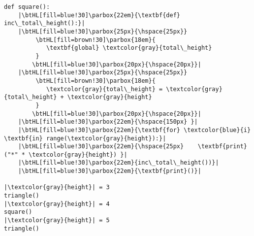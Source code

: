 \begin{lstlisting}[mathescape,escapechar=|]
def square():
    |\btHL[fill=blue!30]\parbox{22em}{\textbf{def} inc\_total\_height():}|
    |\btHL[fill=blue!30]\parbox{25px}{\hspace{25px}}
         \btHL[fill=brown!30]\parbox{18em}{
            \textbf{global} \textcolor{gray}{total\_height}
         }
        \btHL[fill=blue!30]\parbox{20px}{\hspace{20px}}|
    |\btHL[fill=blue!30]\parbox{25px}{\hspace{25px}}
         \btHL[fill=brown!30]\parbox{18em}{
            \textcolor{gray}{total\_height} = \textcolor{gray}{total\_height} + \textcolor{gray}{height}
         }
        \btHL[fill=blue!30]\parbox{20px}{\hspace{20px}}|
    |\btHL[fill=blue!30]\parbox{22em}{\hspace{150px} }|
    |\btHL[fill=blue!30]\parbox{22em}{\textbf{for} \textcolor{blue}{i} \textbf{in} range(\textcolor{gray}{height}):}|
    |\btHL[fill=blue!30]\parbox{22em}{\hspace{25px}    \textbf{print}("*" * \textcolor{gray}{height}) }|
    |\btHL[fill=blue!30]\parbox{22em}{inc\_total\_height())}|
    |\btHL[fill=blue!30]\parbox{22em}{\textbf{print}()}| 

|\textcolor{gray}{height}| = 3
triangle()
|\textcolor{gray}{height}| = 4
square()
|\textcolor{gray}{height}| = 5
triangle()
\end{lstlisting}
